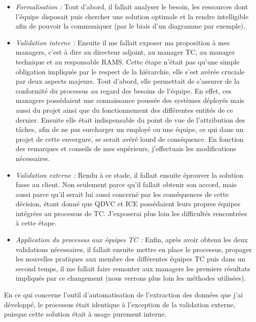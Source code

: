 \begin{itemize}
\item \textit{Formalisation :} Tout d'abord, il fallait analyser le besoin, les ressources dont l'équipe disposait puis chercher une solution optimale et la rendre intelligible afin de pouvoir la communiquer (par le biais d'un diagramme par exemple).
\item \textit{Validation interne :} Ensuite il me fallait exposer ma proposition à mes managers, c'est à dire au directeur adjoint, au manager \gls{TC}, au manager technique et au responsable \gls{RAMS}. Cette étape n'était pas qu'une simple obligation impliquée par le respect de la hiérarchie, elle s'est avérée cruciale par deux aspects majeurs. Tout d'abord, elle permettait de s'assurer de la conformité du processus au regard des besoins de l'équipe. En effet, ces managers possédaient une connaissance poussée des systèmes déployés mais aussi du projet ainsi que du fonctionnement des différentes entités de ce dernier. Ensuite elle était indispensable du point de vue de l'attribution des tâches, afin de ne pas surcharger un employé ou une équipe, ce qui dans un projet de cette envergure, se serait avéré lourd de conséquence. En fonction des remarques et conseils de mes supérieurs, j'effectuais les modifications nécessaires.
\item \textit{Validation externe :} Rendu à ce stade, il fallait ensuite éprouver la solution fasse au client. Non seulement parce qu'il fallait obtenir son accord, mais aussi parce qu'il serait lui aussi concerné par les conséquences de cette décision, étant donné que QDVC et ICE possédaient leurs propres équipes intégrées au processus de \gls{TC}. J'exposerai plus loin les difficultés rencontrées à cette étape.
\item \textit{Application du processus aux équipes \gls{TC} :} Enfin, après avoir obtenu les deux validations nécessaires, il fallait ensuite mettre en place le processus, propager les nouvelles pratiques aux membre des différentes équipes \gls{TC} puis dans un second temps, il me fallait faire remonter aux managers les premiers résultats impliqués par ce changement (nous verrons plus loin les méthodes utilisées).
\end{itemize}

En ce qui concerne l'outil d'automatisation de l'extraction des données que j'ai développé, le processus était identique à l'exception de la validation externe, puisque cette solution était à usage purement interne.

